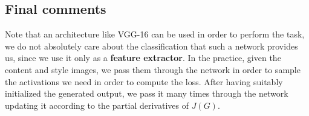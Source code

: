 \subsection{Final comments}
Note that an architecture like VGG-16 can be used in order to perform the task, we do not absolutely care about the classification that such a network provides us, since we use it only as a \textbf{feature extractor}. In the practice, given the content and style images, we pass them through the network in order to sample the activations we need in order to compute the loss. After having suitably initialized the generated output, we pass it many times through the network updating it according to the partial derivatives of $J(G)$. 


 






